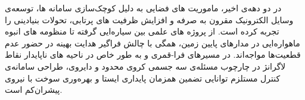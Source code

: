 %
%
%
%
%
%
%

در دو دهه‌ی اخیر، ماموریت های فضایی به دلیل کوچک‌سازی سامانه ها، توسعه‌ی وسایل الکترونیک مقرون به صرفه و افزایش ظرفیت های پرتابی، تحولات بنیادینی را تجربه کرده است. از پروژه های علمی بین سیاره‌ایی گرفته تا منظومه های انبوه ماهواره‌ایی در مدارهای پایین زمین، همگی با چالش فراگیر هدایت بهینه در حضور عدم قطعیت‌ها مواجه‌اند. در مسیرهای فرا-قمری
 و به طور خاص در ناحیه های ناپایدار نقاط لاگرانژ در چارچوب مسئله‌ی سه جسمی کروی محدود و دایروی، طراحی سامانه‌ی کنترل مستلزم توانایی تضمین همزمان پایداری ایستا و بهره‌وری سوخت با نیروی پیشران‌کم
 است.

